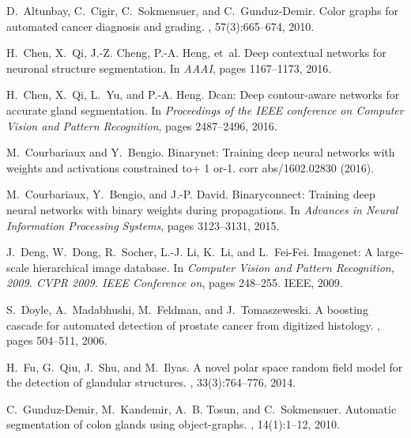 \documentclass[10pt,twocolumn,letterpaper]{article}
\begin{document}
{\small

\begin{thebibliography}{10}\itemsep=-1pt

D.~Altunbay, C.~Cigir, C.~Sokmensuer, and C.~Gunduz-Demir.
\newblock Color graphs for automated cancer diagnosis and grading.
, 57(3):665--674,
  2010.

H.~Chen, X.~Qi, J.-Z. Cheng, P.-A. Heng, et~al.
\newblock Deep contextual networks for neuronal structure segmentation.
\newblock In {\em AAAI}, pages 1167--1173, 2016.

H.~Chen, X.~Qi, L.~Yu, and P.-A. Heng.
\newblock Dcan: Deep contour-aware networks for accurate gland segmentation.
\newblock In {\em Proceedings of the IEEE conference on Computer Vision and
  Pattern Recognition}, pages 2487--2496, 2016.

M.~Courbariaux and Y.~Bengio.
\newblock Binarynet: Training deep neural networks with weights and activations
  constrained to+ 1 or-1. corr abs/1602.02830 (2016).

M.~Courbariaux, Y.~Bengio, and J.-P. David.
\newblock Binaryconnect: Training deep neural networks with binary weights
  during propagations.
\newblock In {\em Advances in Neural Information Processing Systems}, pages
  3123--3131, 2015.

J.~Deng, W.~Dong, R.~Socher, L.-J. Li, K.~Li, and L.~Fei-Fei.
\newblock Imagenet: A large-scale hierarchical image database.
\newblock In {\em Computer Vision and Pattern Recognition, 2009. CVPR 2009.
  IEEE Conference on}, pages 248--255. IEEE, 2009.

S.~Doyle, A.~Madabhushi, M.~Feldman, and J.~Tomaszeweski.
\newblock A boosting cascade for automated detection of prostate cancer from
  digitized histology.
, pages 504--511, 2006.

H.~Fu, G.~Qiu, J.~Shu, and M.~Ilyas.
\newblock A novel polar space random field model for the detection of glandular
  structures.
, 33(3):764--776, 2014.

C.~Gunduz-Demir, M.~Kandemir, A.~B. Tosun, and C.~Sokmensuer.
\newblock Automatic segmentation of colon glands using object-graphs.
, 14(1):1--12, 2010.


\end{thebibliography}}
\end{document}

